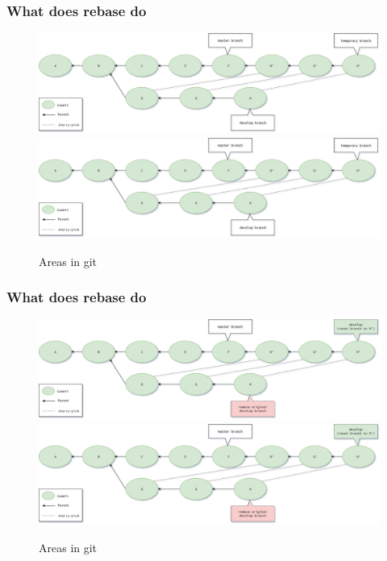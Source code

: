\begin{frame}[fragile]
    \frametitle{What does rebase do}
    \begin{figure}
        \begin{center}
            {
                \includegraphics[width=1\textwidth,keepaspectratio]{./images/Rebase-Process.png}
            }
            {
                \includegraphics[width=1\textwidth,keepaspectratio]{./images/Rebase-Process.png}
            }
            \caption{Areas in git}
        \end{center}
    \end{figure}
\end{frame}

\begin{frame}[fragile]
    \frametitle{What does rebase do}
    \begin{figure}
        \begin{center}
            {
                \includegraphics[width=1\textwidth,keepaspectratio]{./images/Rebase-Completed.png}
            }
            {
                \includegraphics[width=1\textwidth,keepaspectratio]{./images/Rebase-Completed.png}
            }
            \caption{Areas in git}
        \end{center}
    \end{figure}
\end{frame}

